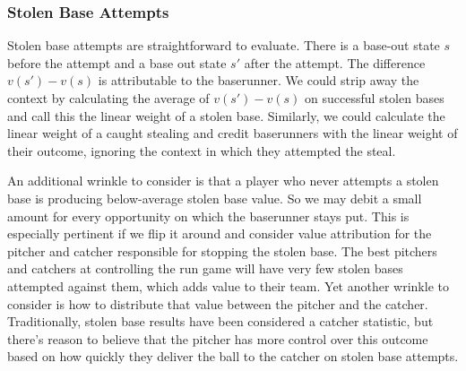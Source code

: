 \documentclass{article}
\begin{document}
    \subsubsection{\sc Stolen Base Attempts}

      Stolen base attempts are straightforward to evaluate. There is a base-out state $s$ before the attempt and a base out state $s'$ after the attempt. The difference $v(s') - v(s)$ is attributable to the baserunner. We could strip away the context by calculating the average of $v(s') - v(s)$ on successful stolen bases and call this the linear weight of a stolen base. Similarly, we could calculate the linear weight of a caught stealing and credit baserunners with the linear weight of their outcome, ignoring the context in which they attempted the steal.

      An additional wrinkle to consider is that a player who never attempts a stolen base is producing below-average stolen base value. So we may debit a small amount for every opportunity on which the baserunner stays put. This is especially pertinent if we flip it around and consider value attribution for the pitcher and catcher responsible for stopping the stolen base. The best pitchers and catchers at controlling the run game will have very few stolen bases attempted against them, which adds value to their team. Yet another wrinkle to consider is how to distribute that value between the pitcher and the catcher. Traditionally, stolen base results have been considered a catcher statistic, but there's reason to believe that the pitcher has more control over this outcome based on how quickly they deliver the ball to the catcher on stolen base attempts.
\end{document}
